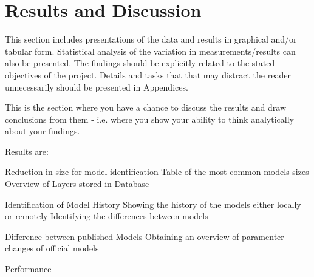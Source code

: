 \section{Results and Discussion}
This section includes presentations of the data and results in graphical and/or tabular form. Statistical analysis of the variation in measurements/results can also be presented. The findings should be explicitly related to the stated objectives of the project. Details and tasks that that may distract the reader unnecessarily should be presented in Appendices.

This is the section where you have a chance to discuss the results and draw conclusions from them - i.e. where you show your ability to think analytically about your findings.

Results are:

Reduction in size for model identification
    Table of the most common models sizes
    Overview of Layers stored in Database

Identification of Model History
    Showing the history of the models either locally or remotely
    Identifying the differences between models

Difference between published Models
    Obtaining an overview of paramenter changes of official models

Performance




